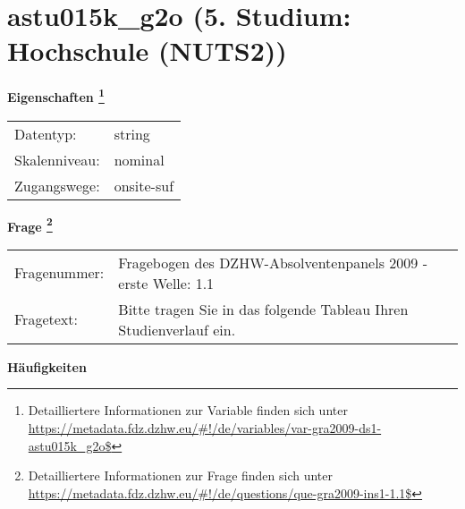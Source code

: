 
    \setcounter{footnote}{0}

    \vspace*{-1.8cm}
	\section{astu015k\_g2o (5. Studium: Hochschule (NUTS2))}
	\label{section:astu015k_g2o}



    \vspace*{0.5cm}
    \noindent\textbf{Eigenschaften
	\footnote{Detailliertere Informationen zur Variable finden sich unter
		\url{https://metadata.fdz.dzhw.eu/\#!/de/variables/var-gra2009-ds1-astu015k_g2o$}}}\\
	\begin{tabularx}{\hsize}{@{}lX}
	Datentyp: & string \\
	Skalenniveau: & nominal \\
	Zugangswege: &
	  onsite-suf
 \\
    \end{tabularx}



				\vspace*{0.5cm}
                \noindent\textbf{Frage
	                \footnote{Detailliertere Informationen zur Frage finden sich unter
		              \url{https://metadata.fdz.dzhw.eu/\#!/de/questions/que-gra2009-ins1-1.1$}}}\\
				\begin{tabularx}{\hsize}{@{}lX}
					Fragenummer: &
					  Fragebogen des DZHW-Absolventenpanels 2009 - erste Welle:
					  1.1
 \\
					Fragetext: & Bitte tragen Sie in das folgende Tableau Ihren Studienverlauf ein. \\
				\end{tabularx}





        		\vspace*{0.5cm}
                \noindent\textbf{Häufigkeiten}


